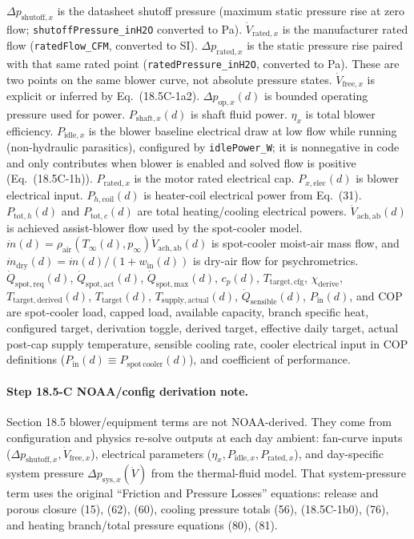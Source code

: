 \documentclass[11pt]{article}
\begin{document}
\(\Delta p_{\mathrm{shutoff},x}\) is the datasheet shutoff pressure (maximum static pressure rise at zero flow; \texttt{shutoffPressure\_inH2O} converted to Pa). \(\dot V_{\mathrm{rated},x}\) is the manufacturer rated flow (\texttt{ratedFlow\_CFM}, converted to SI). \(\Delta p_{\mathrm{rated},x}\) is the static pressure rise paired with that same rated point (\texttt{ratedPressure\_inH2O}, converted to Pa). These are two points on the same blower curve, not absolute pressure states. \(\dot V_{\mathrm{free},x}\) is explicit or inferred by Eq.~(18.5C-1a2). \(\Delta p_{\mathrm{op},x}(d)\) is bounded operating pressure used for power. \(P_{\mathrm{shaft},x}(d)\) is shaft fluid power. \(\eta_x\) is total blower efficiency. \(P_{\mathrm{idle},x}\) is the blower baseline electrical draw at low flow while running (non-hydraulic parasitics), configured by \texttt{idlePower\_W}; it is nonnegative in code and only contributes when blower is enabled and solved flow is positive (Eq.~(18.5C-1h)). \(P_{\mathrm{rated},x}\) is the motor rated electrical cap. \(P_{x,\mathrm{elec}}(d)\) is blower electrical input. \(P_{h,\mathrm{coil}}(d)\) is heater-coil electrical power from Eq.~(31). \(P_{\mathrm{tot},h}(d)\) and \(P_{\mathrm{tot},c}(d)\) are total heating/cooling electrical powers. \(\dot V_{\mathrm{ach},\mathrm{ab}}(d)\) is achieved assist-blower flow used by the spot-cooler model. \(\dot m(d)=\rho_{\mathrm{air}}(T_\infty(d),p_\infty)\dot V_{\mathrm{ach},\mathrm{ab}}(d)\) is spot-cooler moist-air mass flow, and \(\dot m_{\mathrm{dry}}(d)=\dot m(d)/(1+w_{\mathrm{in}}(d))\) is dry-air flow for psychrometrics. \(\dot Q_{\mathrm{spot,req}}(d)\), \(\dot Q_{\mathrm{spot,act}}(d)\), \(\dot Q_{\mathrm{spot,max}}(d)\), \(c_p(d)\), \(T_{\mathrm{target,cfg}}\), \(\chi_{\mathrm{derive}}\), \(T_{\mathrm{target,derived}}(d)\), \(T_{\mathrm{target}}(d)\), \(T_{\mathrm{supply,actual}}(d)\), \(\dot Q_{\mathrm{sensible}}(d)\), \(P_{\mathrm{in}}(d)\), and \(\mathrm{COP}\) are spot-cooler load, capped load, available capacity, branch specific heat, configured target, derivation toggle, derived target, effective daily target, actual post-cap supply temperature, sensible cooling rate, cooler electrical input in COP definitions (\(P_{\mathrm{in}}(d)\equiv P_{\mathrm{spot\,cooler}}(d)\)), and coefficient of performance.

\paragraph{Step 18.5-C NOAA/config derivation note.}
Section 18.5 blower/equipment terms are not NOAA-derived. They come from configuration and physics re-solve outputs at each day ambient: fan-curve inputs (\(\Delta p_{\mathrm{shutoff},x},\dot V_{\mathrm{free},x}\)), electrical parameters (\(\eta_x,P_{\mathrm{idle},x},P_{\mathrm{rated},x}\)), and day-specific system pressure \(\Delta p_{\mathrm{sys},x}(\dot V)\) from the thermal-fluid model. That system-pressure term uses the original ``Friction and Pressure Losses'' equations: release and porous closure (15), (62), (60), cooling pressure totals (56), (18.5C-1b0), (76), and heating branch/total pressure equations (80), (81).
\end{document}
